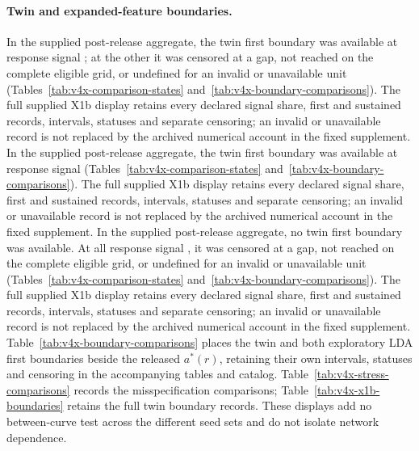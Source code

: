 \paragraph{Twin and expanded-feature boundaries.}\label{supp:x1b-release}
In the supplied post-release aggregate, the twin first boundary was available at  response signal ; at the other  it was censored at a gap, not reached on the complete eligible grid, or undefined for an invalid or unavailable unit (Tables~\ref{tab:v4x-comparison-states} and~\ref{tab:v4x-boundary-comparisons}). The full supplied X1b display retains every declared signal share, first and sustained records, intervals, statuses and separate censoring; an invalid or unavailable record is not replaced by the archived numerical account in the fixed supplement.
In the supplied post-release aggregate, the twin first boundary was available at  response signal  (Tables~\ref{tab:v4x-comparison-states} and~\ref{tab:v4x-boundary-comparisons}). The full supplied X1b display retains every declared signal share, first and sustained records, intervals, statuses and separate censoring; an invalid or unavailable record is not replaced by the archived numerical account in the fixed supplement.
In the supplied post-release aggregate, no twin first boundary was available. At all  response signal , it was censored at a gap, not reached on the complete eligible grid, or undefined for an invalid or unavailable unit (Tables~\ref{tab:v4x-comparison-states} and~\ref{tab:v4x-boundary-comparisons}). The full supplied X1b display retains every declared signal share, first and sustained records, intervals, statuses and separate censoring; an invalid or unavailable record is not replaced by the archived numerical account in the fixed supplement.
Table~\ref{tab:v4x-boundary-comparisons} places the twin and both exploratory LDA first boundaries beside the released $a^*(r)$, retaining their own intervals, statuses and censoring in the accompanying tables and catalog.
Table~\ref{tab:v4x-stress-comparisons} records the misspecification comparisons; Table~\ref{tab:v4x-x1b-boundaries} retains the full twin boundary records. These displays add no between-curve test across the different seed sets and do not isolate network dependence.

